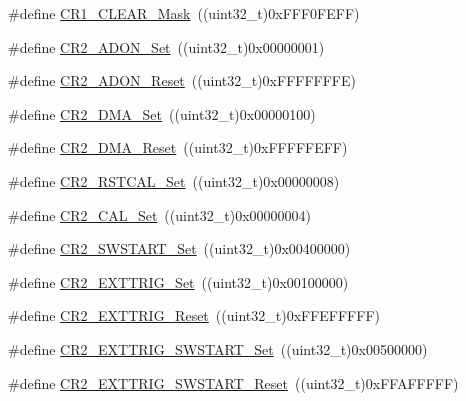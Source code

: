 \begin{DoxyCompactItemize}
\item 
\#define \mbox{\hyperlink{group___a_d_c___private___defines_ga67f7dd35ea3d1296677e5fc50b88fa90}{C\+R1\+\_\+\+C\+L\+E\+A\+R\+\_\+\+Mask}}~((uint32\+\_\+t)0x\+F\+F\+F0\+F\+E\+F\+F)
\item 
\#define \mbox{\hyperlink{group___a_d_c___private___defines_ga21779759f3d5d1389b114d7a1bb6fca1}{C\+R2\+\_\+\+A\+D\+O\+N\+\_\+\+Set}}~((uint32\+\_\+t)0x00000001)
\item 
\#define \mbox{\hyperlink{group___a_d_c___private___defines_gaa3eb5d77998387159508a57d7e09f459}{C\+R2\+\_\+\+A\+D\+O\+N\+\_\+\+Reset}}~((uint32\+\_\+t)0x\+F\+F\+F\+F\+F\+F\+F\+E)
\item 
\#define \mbox{\hyperlink{group___a_d_c___private___defines_ga7fa8ba27f5b249dd7cb0b6e53a25d6e2}{C\+R2\+\_\+\+D\+M\+A\+\_\+\+Set}}~((uint32\+\_\+t)0x00000100)
\item 
\#define \mbox{\hyperlink{group___a_d_c___private___defines_ga8e674886185af86bc17d9266ddbdca7c}{C\+R2\+\_\+\+D\+M\+A\+\_\+\+Reset}}~((uint32\+\_\+t)0x\+F\+F\+F\+F\+F\+E\+F\+F)
\item 
\#define \mbox{\hyperlink{group___a_d_c___private___defines_gaf256d4606fbe82d7e4cdc8d177653b53}{C\+R2\+\_\+\+R\+S\+T\+C\+A\+L\+\_\+\+Set}}~((uint32\+\_\+t)0x00000008)
\item 
\#define \mbox{\hyperlink{group___a_d_c___private___defines_ga6705aae168367a2d961e64dd9137ae3a}{C\+R2\+\_\+\+C\+A\+L\+\_\+\+Set}}~((uint32\+\_\+t)0x00000004)
\item 
\#define \mbox{\hyperlink{group___a_d_c___private___defines_gac40733c6a8918c16cd52fcade75a6de6}{C\+R2\+\_\+\+S\+W\+S\+T\+A\+R\+T\+\_\+\+Set}}~((uint32\+\_\+t)0x00400000)
\item 
\#define \mbox{\hyperlink{group___a_d_c___private___defines_gaf39824995dbcbabf76697cd7116352d6}{C\+R2\+\_\+\+E\+X\+T\+T\+R\+I\+G\+\_\+\+Set}}~((uint32\+\_\+t)0x00100000)
\item 
\#define \mbox{\hyperlink{group___a_d_c___private___defines_ga8a96cb9aac77bab199f3dff54da230a6}{C\+R2\+\_\+\+E\+X\+T\+T\+R\+I\+G\+\_\+\+Reset}}~((uint32\+\_\+t)0x\+F\+F\+E\+F\+F\+F\+F\+F)
\item 
\#define \mbox{\hyperlink{group___a_d_c___private___defines_gad9bed838631a650428d2318694a66094}{C\+R2\+\_\+\+E\+X\+T\+T\+R\+I\+G\+\_\+\+S\+W\+S\+T\+A\+R\+T\+\_\+\+Set}}~((uint32\+\_\+t)0x00500000)
\item 
\#define \mbox{\hyperlink{group___a_d_c___private___defines_gad0a6e5cf09868318178434340ade2fe1}{C\+R2\+\_\+\+E\+X\+T\+T\+R\+I\+G\+\_\+\+S\+W\+S\+T\+A\+R\+T\+\_\+\+Reset}}~((uint32\+\_\+t)0x\+F\+F\+A\+F\+F\+F\+F\+F)

\end{DoxyCompactItemize}
